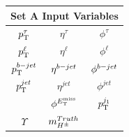      \begin{table}[!thp]
				\begin{subtable}[c]{0.15\textwidth}
					\centering
					\begin{tabular}{| c | c | c |}
		        \multicolumn{3}{c}{\textbf{Set A Input Variables}} \\ \hline \hline
		        $p_{\text{T}}^{\tau}$ & $\eta^{\tau}$ & $\phi^{\tau}$  \\ \hline
		        $p_{\text{T}}^{\ell}$ & $\eta^{\ell}$ & $\phi^{\ell}$  \\ \hline
		        $p_{\text{T}}^{b-jet}$ & $\eta^{b-jet}$ & $\phi^{b-jet}$  \\ \hline
		        $p_{\text{T}}^{jet}$ & $\eta^{jet}$ & $\phi^{jet}$  \\ \hline
		        \Etm & $\phi^{E_\text{T}^\text{miss}}$ & $p_{\text{T}}^{j_{1}}$  \\ \hline
		        $\Upsilon$ & $m_{H^{\pm}}^{Truth}$ &  \\ \hline 
	        \end{tabular}
	      \end{subtable}


\end{table}
